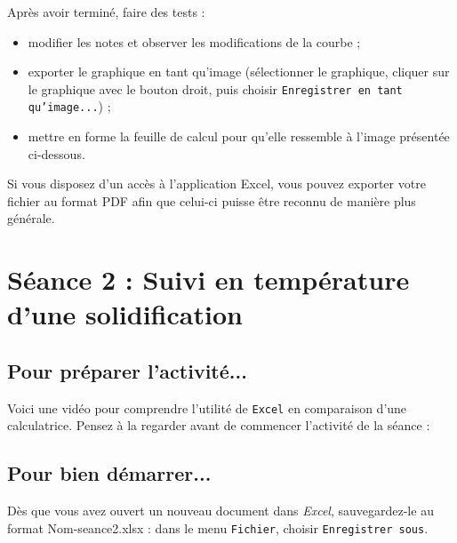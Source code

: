 Après avoir terminé, faire des tests :

\begin{itemize}
\item modifier les notes et observer les modifications de la courbe ;
\item exporter le graphique en tant qu'image (sélectionner le graphique, cliquer sur le graphique avec le bouton droit, puis choisir \texttt{Enregistrer en tant qu'image...}) ;
\item mettre en forme la feuille de calcul pour qu'elle ressemble à l'image présentée ci-dessous.
\end{itemize}


Si vous disposez d'un accès à l'application Excel, vous pouvez exporter votre fichier au format PDF afin que celui-ci puisse être reconnu de manière plus générale.


\newpage

%
%
%
%




\section{Séance 2 : Suivi en température d'une solidification}\label{ficheTableur2}

\subsection{Pour préparer l'activité...}

Voici une vidéo pour comprendre l'utilité de \texttt{Excel} en comparaison d'une calculatrice. Pensez à la regarder avant de commencer l'activité de la séance :

\begin{center}
\end{center}

\subsection{Pour bien démarrer...}

Dès que vous avez ouvert un nouveau document dans \emph{Excel}, sauvegardez-le au format Nom-seance2.xlsx : dans le menu \texttt{Fichier}, choisir \texttt{Enregistrer sous}.

